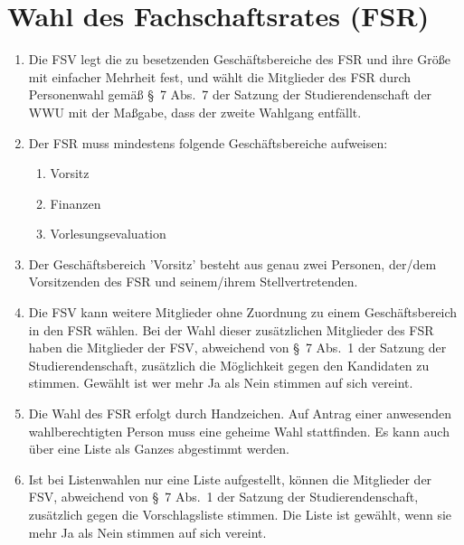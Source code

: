 \section{Wahl des Fachschaftsrates (FSR)}
\begin{enumerate}
	\item \label{abs:wahl1} Die FSV legt die zu besetzenden Geschäftsbereiche des FSR und ihre Größe mit einfacher Mehrheit fest, und wählt die Mitglieder des FSR durch Personenwahl gemäß §~7 Abs.~7 der Satzung der Studierendenschaft der WWU mit der Maßgabe, dass der zweite Wahlgang entfällt.
	\item \label{abs:geschaeftsbereiche} Der FSR muss mindestens folgende Geschäftsbereiche aufweisen:
	\begin{enumerate}
		\item Vorsitz
		\item Finanzen
		\item Vorlesungsevaluation
	\end{enumerate}
	\item Der Geschäftsbereich 'Vorsitz' besteht aus genau zwei Personen, der/dem Vorsitzenden des FSR und seinem/ihrem Stellvertretenden.
	\item Die FSV kann weitere Mitglieder ohne Zuordnung zu einem Geschäftsbereich in den FSR wählen. Bei der Wahl dieser zusätzlichen Mitglieder des FSR haben die Mitglieder der FSV, abweichend von §~7 Abs.~1 der Satzung der Studierendenschaft, zusätzlich die Möglichkeit gegen den Kandidaten zu stimmen. Gewählt ist wer mehr Ja als Nein stimmen auf sich vereint.
	\item Die Wahl des FSR erfolgt durch Handzeichen.
		Auf Antrag einer anwesenden wahlberechtigten Person muss eine geheime Wahl stattfinden.
		Es kann auch über eine Liste als Ganzes abgestimmt werden.
	\item Ist bei Listenwahlen nur eine Liste aufgestellt, können die Mitglieder der FSV, abweichend von §~7 Abs.~1 der Satzung der Studierendenschaft, zusätzlich gegen die Vorschlagsliste stimmen.
	Die Liste ist gewählt, wenn sie mehr Ja als Nein stimmen auf sich vereint.
\end{enumerate}

